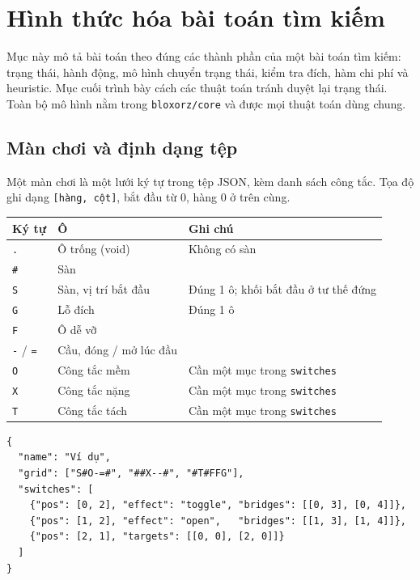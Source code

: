 \section{Hình thức hóa bài toán tìm kiếm}

Mục này mô tả bài toán theo đúng các thành phần của một bài toán tìm kiếm: trạng thái, hành động, mô hình chuyển trạng thái, kiểm tra đích, hàm chi phí và heuristic. Mục cuối trình bày cách các thuật toán tránh duyệt lại trạng thái. Toàn bộ mô hình nằm trong \texttt{bloxorz/core} và được mọi thuật toán dùng chung.

\subsection{Màn chơi và định dạng tệp}

Một màn chơi là một lưới ký tự trong tệp JSON, kèm danh sách công tắc. Tọa độ ghi dạng \texttt{[hàng, cột]}, bắt đầu từ 0, hàng 0 ở trên cùng.

{\renewcommand{\arraystretch}{1.25}
\begin{longtable}{|l|l|l|}
\hline
\textbf{Ký tự} & \textbf{Ô} & \textbf{Ghi chú} \\ \hline
\endhead
\hline
\endlastfoot
\texttt{.} & Ô trống (void) & Không có sàn \\ \hline
\texttt{\#} & Sàn &  \\ \hline
\texttt{S} & Sàn, vị trí bắt đầu & Đúng 1 ô; khối bắt đầu ở tư thế đứng \\ \hline
\texttt{G} & Lỗ đích & Đúng 1 ô \\ \hline
\texttt{F} & Ô dễ vỡ &  \\ \hline
\texttt{-} / \texttt{=} & Cầu, đóng / mở lúc đầu &  \\ \hline
\texttt{O} & Công tắc mềm & Cần một mục trong \texttt{switches} \\ \hline
\texttt{X} & Công tắc nặng & Cần một mục trong \texttt{switches} \\ \hline
\texttt{T} & Công tắc tách & Cần một mục trong \texttt{switches} \\
\end{longtable}
}

\begin{Verbatim}[breaklines=true, fontsize=\footnotesize, frame=single]
{
  "name": "Ví dụ",
  "grid": ["S#O-=#", "##X--#", "#T#FFG"],
  "switches": [
    {"pos": [0, 2], "effect": "toggle", "bridges": [[0, 3], [0, 4]]},
    {"pos": [1, 2], "effect": "open",   "bridges": [[1, 3], [1, 4]]},
    {"pos": [2, 1], "targets": [[0, 0], [2, 0]]}
  ]
}
\end{Verbatim}

